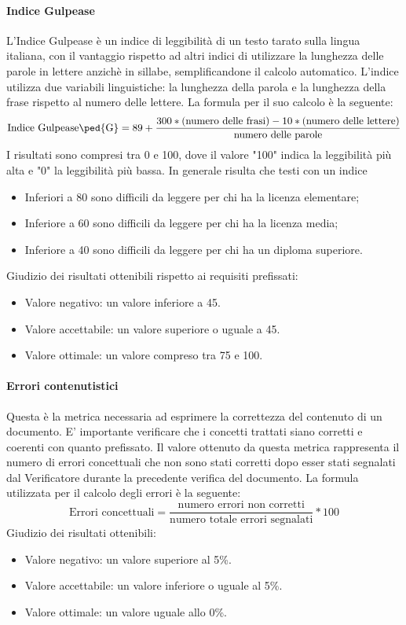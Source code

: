 \paragraph{Indice Gulpease}
L'{Indice Gulpease} è un indice di leggibilità di un testo tarato sulla lingua italiana, con il vantaggio rispetto ad altri indici di utilizzare la lunghezza delle parole in lettere anzichè in sillabe, semplificandone il calcolo automatico. L'indice utilizza due variabili linguistiche: la lunghezza della parola e la lunghezza della frase rispetto al numero delle lettere.
\newline La formula per il suo calcolo è la seguente:
\begin{displaymath}
\mbox{{Indice Gulpease}\ped{G}}= 89+\frac{300*\mbox{(numero delle frasi)}-10*\mbox{(numero delle lettere)}}{\mbox{numero delle parole}}
\end{displaymath}
I risultati sono compresi tra 0 e 100, dove il valore "100" indica la leggibilità più alta e "0" la leggibilità più bassa. In generale risulta che testi con un indice
\begin{itemize}
	\item Inferiori a 80 sono difficili da leggere per chi ha la licenza elementare;
	\item Inferiore a 60 sono difficili da leggere per chi ha la licenza media;
	\item Inferiore a 40 sono difficili da leggere per chi ha un diploma superiore.
\end{itemize}
Giudizio dei risultati ottenibili rispetto ai requisiti prefissati:
\begin{itemize}
	\item Valore negativo: un valore inferiore a 45. 
	\item Valore accettabile: un valore superiore o uguale a 45.
	\item Valore ottimale: un valore compreso tra 75 e 100.
\end{itemize}
\paragraph{Errori contenutistici}
Questa è la metrica necessaria ad esprimere la correttezza del contenuto di un documento. E' importante verificare che i concetti trattati siano corretti e coerenti con quanto prefissato. Il valore ottenuto da questa metrica rappresenta il numero di errori concettuali che non sono stati corretti dopo esser stati segnalati dal {Verificatore} durante la precedente verifica del documento.
\newline La formula utilizzata per il calcolo degli errori è la seguente:
\begin{displaymath}
\mbox{Errori concettuali}=\frac{\mbox{numero errori non corretti}}{\mbox{numero totale errori segnalati}}*100
\end{displaymath}
Giudizio dei risultati ottenibili:
\begin{itemize}
	\item Valore negativo: un valore superiore al 5\%. 
	\item Valore accettabile: un valore inferiore o uguale al 5\%.
	\item Valore ottimale: un valore uguale allo 0\%.
\end{itemize}
